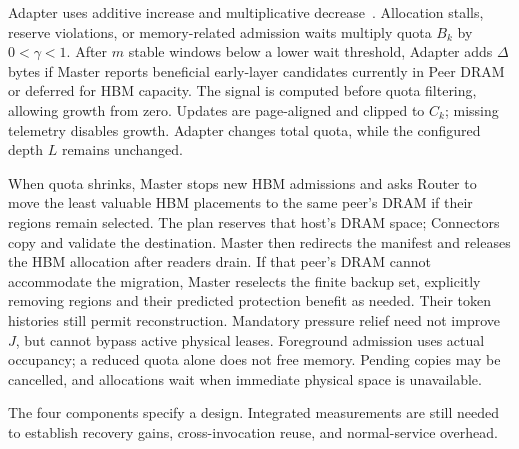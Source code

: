 Adapter uses additive increase and multiplicative
decrease~\cite{chiu1989aimd}. Allocation stalls, reserve violations, or
memory-related admission waits multiply quota $B_k$ by $0<\gamma<1$.
After $m$ stable windows below a lower wait threshold, Adapter adds
$\Delta$ bytes if Master reports beneficial early-layer candidates
currently in Peer DRAM or deferred for HBM capacity. The signal is computed
before quota filtering, allowing growth from zero. Updates are
page-aligned and clipped to $C_k$; missing telemetry disables growth.
Adapter changes total quota, while the configured depth $L$ remains
unchanged.

When quota shrinks, Master stops new HBM admissions and asks Router
to move the least valuable HBM placements to the same peer's DRAM if
their regions remain selected. The plan reserves that host's DRAM
space; Connectors copy and validate the destination. Master then
redirects the manifest and releases the HBM allocation after readers
drain. If that peer's DRAM cannot accommodate the migration, Master
reselects the finite backup set, explicitly removing regions and their
predicted protection benefit as needed.
Their token histories still permit reconstruction. Mandatory pressure
relief need not improve $J$, but cannot bypass active physical leases.
Foreground admission uses actual occupancy; a reduced quota alone
does not free memory. Pending copies may be cancelled, and allocations
wait when immediate physical space is unavailable.

The four components specify a design. Integrated measurements are
still needed to establish recovery gains, cross-invocation reuse, and
normal-service overhead.
